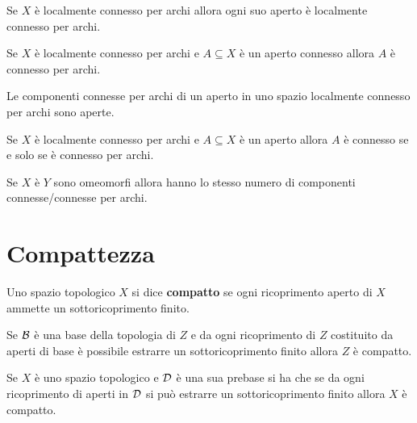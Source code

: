 \begin{multicols*}{2}
\begin{proposition}\label{ApertoInLocalmenteConnessoPerArchiEConnessoPerArchi}
Se $X$ è localmente connesso per archi allora ogni suo aperto è localmente connesso per archi.
\end{proposition}
\begin{corollary}
Se $X$ è localmente connesso per archi e $A\subseteq X$ è un aperto connesso allora $A$ è connesso per archi.
\end{corollary}

\begin{proposition}\label{ComponentiConnessePerArchiDiApertoInLocalmenteConnessoPerArchiSonoAperte}
Le componenti connesse per archi di un aperto in uno spazio localmente connesso per archi sono aperte.
\end{proposition}
\begin{remark}
Se $X$ è localmente connesso per archi e $A\subseteq X$ è un aperto allora $A$ è connesso se e solo se è connesso per archi.
\end{remark}

\begin{remark}
Se $X$ è $Y$ sono omeomorfi allora hanno lo stesso numero di componenti connesse/connesse per archi.
\end{remark}


\section{Compattezza}
\begin{definition}
Uno spazio topologico $X$ si dice \textbf{compatto} se ogni ricoprimento aperto di $X$ ammette un sottoricoprimento finito.
\end{definition}

\begin{theorem}
Se $\mathcal{B}$ è una base della topologia di $Z$ e da ogni ricoprimento di $Z$ costituito da aperti di base è possibile estrarre un sottoricoprimento finito allora $Z$ è compatto.
\end{theorem}

\begin{theorem}[Alexander]\label{TeoremaDiAlexander}
Se $X$ è uno spazio topologico e $\mathcal{D}$ è una sua prebase si ha che se da ogni ricoprimento di aperti in $\mathcal{D}$ si può estrarre un sottoricoprimento finito allora $X$ è compatto.
\end{theorem}


\end{multicols*}
